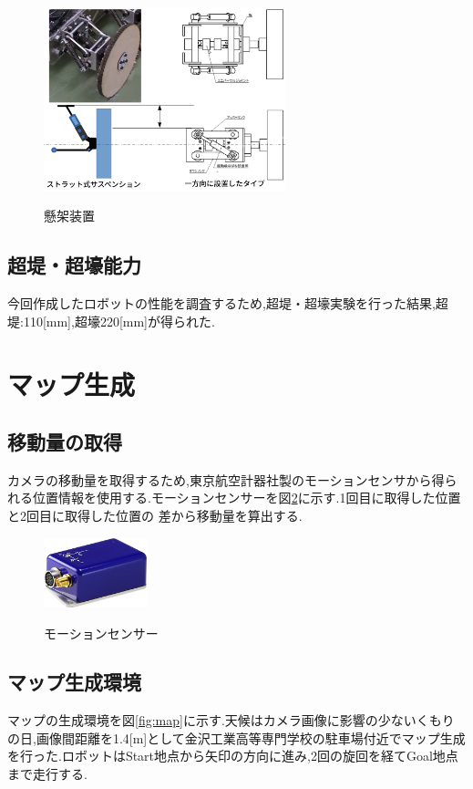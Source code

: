 \documentclass[twocolumn,11pt]{sotsuken_abst}
\begin{document}
\begin{figure}[htp]
 \begin{center}
  \includegraphics[width=70mm]{3.png}
 　\caption{懸架装置}
  \label{fig:kenka}%
 \end{center}
\end{figure}
\subsection{超堤・超壕能力}
今回作成したロボットの性能を調査するため,超堤・超壕実験を行った結果,超堤:110[mm],超壕220[mm]が得られた.

\section{マップ生成}
\subsection{移動量の取得}
カメラの移動量を取得するため,東京航空計器社製のモーションセンサから得られる位置情報を使用する.モーションセンサーを図\ref{fig:motion}に示す.1回目に取得した位置と2回目に取得した位置の
差から移動量を算出する.

\begin{figure}[htp]
 \begin{center}
  \includegraphics[width=30mm]{motion.jpg}
 　\caption{モーションセンサー}
  \label{fig:motion}%
 \end{center}
\end{figure}

\subsection{マップ生成環境}
マップの生成環境を図\ref{fig:map}に示す.天候はカメラ画像に影響の少ないくもりの日,画像間距離を1.4[m]として金沢工業高等専門学校の駐車場付近でマップ生成を行った.ロボットはStart地点から矢印の方向に進み,2回の旋回を経てGoal地点まで走行する.
\end{document}
